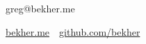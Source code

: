 
\title{\CVAuthor}

\begin{subtitle}
greg@bekher.me

\par
\href{\CVWebpage}
{bekher.me}
\,\SubBulletSymbol\,
\href{https://github.com/bekher}
{github.com/bekher}
\end{subtitle}